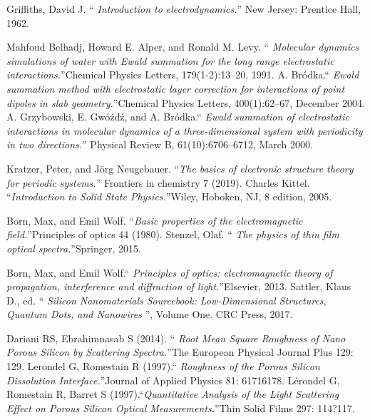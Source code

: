 \documentclass{article}
\begin{document}
\begin{thebibliography}{X}
Griffiths, David J. \textquotedblleft
\emph{Introduction to electrodynamics.}\textquotedblright
 New Jersey: Prentice Hall, 1962.

  Mahfoud Belhadj, Howard E. Alper, and Ronald M. Levy. \textquotedblleft
 \emph{ Molecular dynamics simulations of water with Ewald summation
 	for the long range electrostatic interactions.}\textquotedblright Chemical
  Physics Letters, 179(1-2):13–20, 1991.
   A. Bródka.\textquotedblleft
   \emph{ Ewald summation method with electrostatic layer correction for
  interactions of point dipoles in slab geometry.}\textquotedblright Chemical
Physics Letters, 400(1):62–67, December 2004.
  A. Grzybowski, E. Gwóźdź, and A. Bródka.\textquotedblleft
 \emph{ Ewald summation of electrostatic interactions in molecular dynamics
 	 of a three-dimensional system with periodicity in two directions.}\textquotedblright
  Physical Review B, 61(10):6706–6712, March 2000.

  Kratzer, Peter, and Jörg Neugebauer. \textquotedblleft \emph{The basics of
 	electronic structure theory for periodic systems.}\textquotedblright
  Frontiers in chemistry 7 (2019).
  Charles Kittel. \textquotedblleft \emph{Introduction to Solid State
 	 Physics.}\textquotedblright Wiley, Hoboken, NJ, 8 edition, 2005.

 Born, Max, and Emil Wolf. \textquotedblleft \emph{Basic properties of 
   	the electromagnetic field.}\textquotedblright Principles of optics 44 (1980).
   Stenzel, Olaf. \textquotedblleft \emph{ The physics of thin film 
  	optical spectra.}\textquotedblright Springer, 2015.
  	
  Born, Max, and Emil Wolf.\textquotedblleft \emph{ Principles of optics: 
  	electromagnetic theory of propagation, interference
  	 and diffraction of light.}\textquotedblright Elsevier, 2013.
   Sattler, Klaus D., ed. \textquotedblleft \emph{ Silicon Nanomaterials 
  	Sourcebook: Low-Dimensional Structures, Quantum Dots, and Nanowires }\textquotedblright,
   Volume One. CRC Press, 2017.



 Dariani RS, Ebrahimnasab S (2014). \textquotedblleft
  \emph{Root Mean Square Roughness of Nano Porous Silicon by
    Scattering Spectra.}\textquotedblright The
  European Physical Journal Plus 129: 129.
 Lerondel G, Romestain R (1997).\textquotedblleft
  \emph{Roughness of the Porous Silicon Dissolution
    Interface.}\textquotedblright Journal of Applied Physics 81:
  61716178.
 Lérondel G, Romestain R, Barret S
  (1997).\textquotedblleft \emph{Quantitative Analysis of the Light
    Scattering Effect on Porous Silicon
    Optical Measurements.}\textquotedblright Thin Solid Films 297:
  114?117.


\end{thebibliography}
\end{document}
